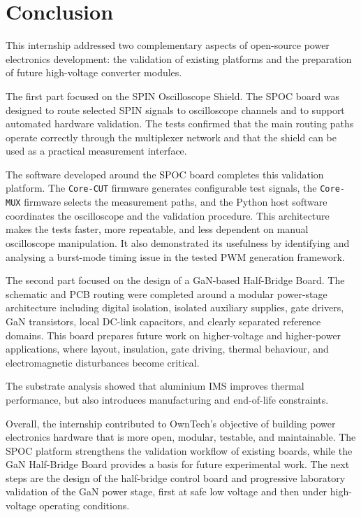 \chapter*{Conclusion}
{}

This internship addressed two complementary aspects of open-source power
electronics development: the validation of existing platforms and the
preparation of future high-voltage converter modules.

The first part focused on the SPIN Oscilloscope Shield. The SPOC board was
designed to route selected SPIN signals to oscilloscope channels and to support
automated hardware validation. The tests confirmed that the main routing paths
operate correctly through the multiplexer network and that the shield can be
used as a practical measurement interface.

The software developed around the SPOC board completes this validation platform. The \texttt{Core-CUT} firmware generates configurable test signals, the \texttt{Core-MUX} firmware selects the measurement paths, and the Python host software coordinates the oscilloscope and the validation procedure. This architecture makes the tests faster, more repeatable, and less dependent on manual oscilloscope manipulation. It also demonstrated its usefulness by identifying and analysing a burst-mode timing issue in the tested PWM generation framework.

The second part focused on the design of a GaN-based Half-Bridge Board. The
schematic and PCB routing were completed around a modular power-stage
architecture including digital isolation, isolated auxiliary supplies, gate
drivers, GaN transistors, local DC-link capacitors, and clearly separated
reference domains. This board prepares future work on higher-voltage and
higher-power applications, where layout, insulation, gate driving, thermal
behaviour, and electromagnetic disturbances become critical.

The substrate analysis showed that aluminium IMS improves thermal performance,
but also introduces manufacturing and end-of-life constraints.

Overall, the internship contributed to OwnTech's objective of building power
electronics hardware that is more open, modular, testable, and maintainable.
The SPOC platform strengthens the validation workflow of existing boards, while
the GaN Half-Bridge Board provides a basis for future experimental work. The
next steps are the design of the half-bridge control board and progressive
laboratory validation of the GaN power stage, first at safe low voltage and then
under high-voltage operating conditions.
